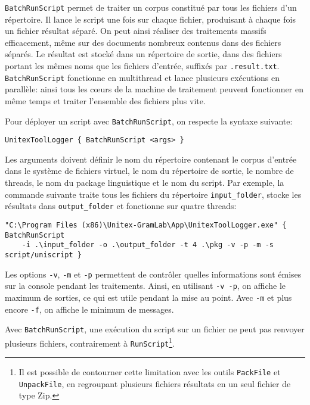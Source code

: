 \verb$BatchRunScript$ permet de traiter un corpus constitué par tous les fichiers d'un répertoire.
Il lance le script une fois sur chaque fichier, produisant à chaque fois un fichier résultat séparé.
On peut ainsi réaliser des traitements massifs efficacement, même sur des documents nombreux
contenus dans des fichiers séparés. Le résultat est stocké dans un répertoire de sortie, dans des
fichiers portant les mêmes noms que les fichiers d'entrée, suffixés par \verb$.result.txt$.
\verb$BatchRunScript$ fonctionne en multithread et lance plusieurs exécutions en parallèle: ainsi
tous les cœurs de la machine de traitement peuvent fonctionner en même temps et traiter
l’ensemble des fichiers plus vite.

\bigskip
\noindent Pour déployer un script avec \verb$BatchRunScript$, on respecte la syntaxe suivante:

\begin{verbatim}
UnitexToolLogger { BatchRunScript <args> }
\end{verbatim}

\noindent Les arguments doivent définir le nom du répertoire contenant le corpus d'entrée
dans le système de fichiers virtuel, le nom du répertoire de sortie, le nombre de threads, le nom
du package linguistique et le nom du script. Par exemple, la commande suivante traite tous les
fichiers du répertoire \verb$input_folder$, stocke les résultats dans \verb$output_folder$
et fonctionne sur quatre threads:

\begin{Verbatim}[fontsize=\small,fontfamily=helvetica]
"C:\Program Files (x86)\Unitex-GramLab\App\UnitexToolLogger.exe" { BatchRunScript
    -i .\input_folder -o .\output_folder -t 4 .\pkg -v -p -m -s script/uniscript }
\end{Verbatim}

\noindent Les options \verb$-v$, \verb$-m$ et \verb$-p$ permettent de contrôler quelles 
informations sont émises sur la console pendant les traitements. Ainsi, en utilisant \verb$-v -p$,
on affiche le maximum de sorties, ce qui est utile pendant la mise au point. Avec \verb$-m$
et plus encore \verb$-f$, on affiche le minimum de messages.

\bigskip
\noindent Avec \verb$BatchRunScript$, une exécution du script sur un fichier ne peut pas
renvoyer plusieurs fichiers, contrairement à \verb$RunScript$\footnote{Il est possible de
contourner cette limitation avec les outils \texttt{PackFile}  et \texttt{UnpackFile}, en
regroupant plusieurs fichiers résultats en un seul fichier de type Zip.}.

